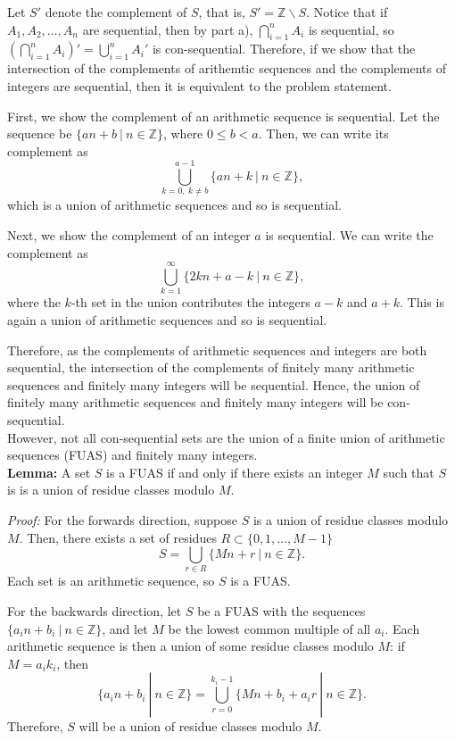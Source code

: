 \documentclass{article}
\begin{document}
    Let $S'$ denote the complement of $S$, that is, $S' = \mathbb{Z}\backslash S$. Notice that if $A_1, A_2, \dots, A_n$ are sequential, then by part a), $\bigcap_{i = 1}^n A_i$ is sequential, so $(\bigcap_{i = 1}^n A_i)' = \bigcup_{i = 1}^n A_i'$ is con-sequential. Therefore, if we show that the intersection of the complements of arithemtic sequences and the complements of integers are sequential, then it is equivalent to the problem statement.

    First, we show the complement of an arithmetic sequence is sequential. Let the sequence be $\{an + b\ |\ n\in \mathbb{Z}\}$, where $0 \leq b < a.$ Then, we can write its complement as $$\bigcup_{k = 0,\ k\neq b}^{a - 1}\{an + k\ |\ n \in \mathbb{Z}\},$$
    which is a union of arithmetic sequences and so is sequential.

    Next, we show the complement of an integer $a$ is sequential. We can write the complement as $$\bigcup_{k = 1}^\infty \{2kn + a - k\ |\ n\in \mathbb{Z}\},$$
    where the $k$-th set in the union contributes the integers $a - k$ and $a + k$. This is again a union of arithmetic sequences and so is sequential.

    Therefore, as the complements of arithmetic sequences and integers are both sequential, the intersection of the complements of finitely many arithmetic sequences and finitely many integers will be sequential. Hence, the union of finitely many arithmetic sequences and finitely many integers will be con-sequential.\\

    However, not all con-sequential sets are the union of a finite union of arithmetic sequences (FUAS) and finitely many integers.  \\

    \textbf{Lemma:} A set $S$ is a FUAS if and only if there exists an integer $M$ such that $S$ is is a union of residue classes modulo $M$.

    \textit{Proof:} For the forwards direction, suppose $S$ is a union of residue classes modulo $M$. Then, there exists a set of residues $R\subset \{0, 1, \dots, M - 1\}$ $$S = \bigcup_{r\in R} \{Mn + r\ |\ n\in \mathbb{Z}\}.$$
    Each set is an arithmetic sequence, so $S$ is a FUAS.
    
    For the backwards direction, let $S$ be a FUAS with the sequences $\{a_in + b_i\ |\ n\in \mathbb{Z}\}$, and let $M$ be the lowest common multiple of all $a_i$. Each arithmetic sequence is then a union of some residue classes modulo $M$: if $M = a_ik_i$, then $$\{a_in + b_i\ |\ n\in \mathbb{Z}\} = \bigcup_{r = 0}^{k_i - 1} \{Mn + b_i + a_ir\ |\ n\in \mathbb{Z}\}.$$
    Therefore, $S$ will be a union of residue classes modulo $M$. \\
    
\end{document}
